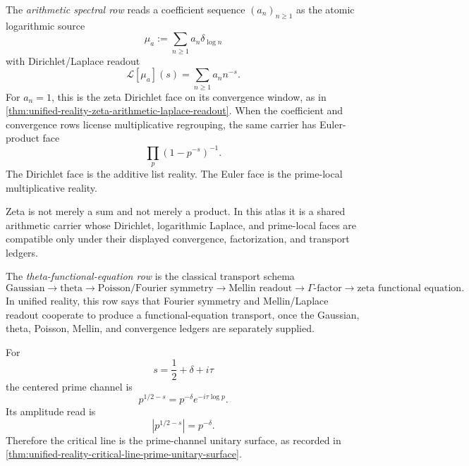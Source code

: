\begin{definition}
\label{def:unified-reality-arithmetic-spectral-atlas-row}
The \emph{arithmetic spectral row} reads a coefficient sequence
$(a_n)_{n\ge1}$ as the atomic logarithmic source
$$
\mu_a:=\sum_{n\ge1}a_n\delta_{\log n}
$$
with Dirichlet/Laplace readout
$$
\mathcal L[\mu_a](s)
=
\sum_{n\ge1}a_n n^{-s}.
$$
For $a_n=1$, this is the zeta Dirichlet face on its convergence window,
as in
\autoref{thm:unified-reality-zeta-arithmetic-laplace-readout}. When the
coefficient and convergence rows license multiplicative regrouping, the
same carrier has Euler-product face
$$
\prod_p(1-p^{-s})^{-1}.
$$
The Dirichlet face is the additive list reality. The Euler face is the
prime-local multiplicative reality.
\end{definition}

\begin{principle}
\label{prin:unified-reality-zeta-shared-arithmetic-carrier}
Zeta is not merely a sum and not merely a product. In this atlas it is a
shared arithmetic carrier whose Dirichlet, logarithmic Laplace, and
prime-local faces are compatible only under their displayed convergence,
factorization, and transport ledgers.
\end{principle}

\begin{definition}
\label{def:unified-reality-theta-functional-equation-atlas-row}
The \emph{theta-functional-equation row} is the classical transport
schema
$$
\text{Gaussian}
\to
\text{theta}
\to
\text{Poisson/Fourier symmetry}
\to
\text{Mellin readout}
\to
\Gamma\text{-factor}
\to
\text{zeta functional equation}.
$$
In unified reality, this row says that Fourier symmetry and
Mellin/Laplace readout cooperate to produce a functional-equation
transport, once the Gaussian, theta, Poisson, Mellin, and convergence
ledgers are separately supplied.
\end{definition}

\begin{definition}
\label{def:unified-reality-prime-channel-boundary-row}
For
$$
s=\frac12+\delta+i\tau
$$
the centered prime channel is
$$
p^{1/2-s}=p^{-\delta}e^{-i\tau\log p}.
$$
Its amplitude read is
$$
|p^{1/2-s}|=p^{-\delta}.
$$
Therefore the critical line is the prime-channel unitary surface,
as recorded in
\autoref{thm:unified-reality-critical-line-prime-unitary-surface}.
\end{definition}

